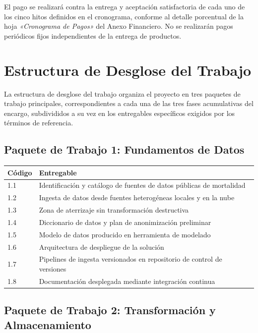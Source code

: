 \documentclass[12pt,a4paper]{article}
\begin{document}
\vspace{8pt}
El pago se realizará contra la entrega y aceptación satisfactoria de cada uno de los cinco hitos
definidos en el cronograma, conforme al detalle porcentual de la hoja \textit{«Cronograma de
Pagos»} del Anexo Financiero. No se realizarán pagos periódicos fijos independientes de la
entrega de productos.

\newpage
\section{Estructura de Desglose del Trabajo}

La estructura de desglose del trabajo organiza el proyecto en tres paquetes de trabajo principales,
correspondientes a cada una de las tres fases acumulativas del encargo, subdivididos a su vez en
los entregables específicos exigidos por los términos de referencia.

\subsection{Paquete de Trabajo 1: Fundamentos de Datos}

\vspace{4pt}
{\small
\begin{tabularx}{\linewidth}{@{} l X @{}}
  \toprule
  \textbf{Código} & \textbf{Entregable} \\
  \midrule
  1.1 & Identificación y catálogo de fuentes de datos públicas de mortalidad \\[3pt]
  1.2 & Ingesta de datos desde fuentes heterogéneas locales y en la nube \\[3pt]
  1.3 & Zona de aterrizaje sin transformación destructiva \\[3pt]
  1.4 & Diccionario de datos y plan de anonimización preliminar \\[3pt]
  1.5 & Modelo de datos producido en herramienta de modelado \\[3pt]
  1.6 & Arquitectura de despliegue de la solución \\[3pt]
  1.7 & Pipelines de ingesta versionados en repositorio de control de versiones \\[3pt]
  1.8 & Documentación desplegada mediante integración continua \\
  \bottomrule
\end{tabularx}
}

\subsection{Paquete de Trabajo 2: Transformación y Almacenamiento}
\end{document}
